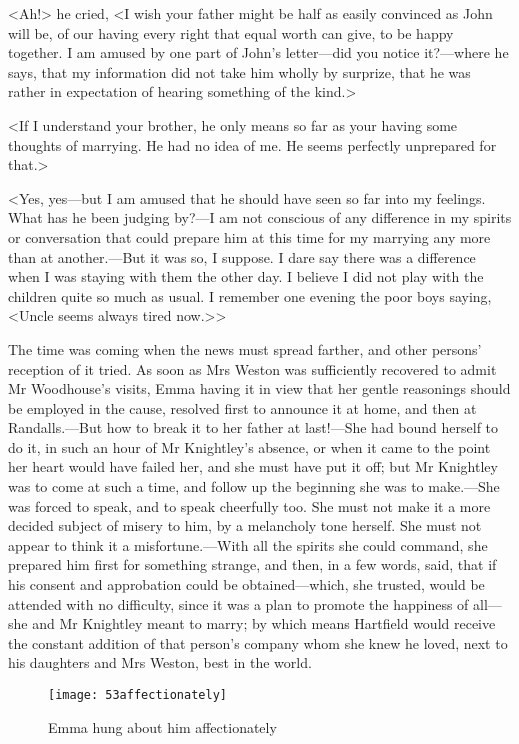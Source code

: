 <Ah!> he cried, <I wish your father might be half as easily convinced as John will be, of our having every right that equal worth can give, to be happy together. I am amused by one part of John's letter—did you notice it?—where he says, that my information did not take him wholly by surprize, that he was rather in expectation of hearing something of the kind.>

<If I understand your brother, he only means so far as your having some thoughts of marrying. He had no idea of me. He seems perfectly unprepared for that.>

<Yes, yes—but I am amused that he should have seen so far into my feelings. What has he been judging by?—I am not conscious of any difference in my spirits or conversation that could prepare him at this time for my marrying any more than at another.—But it was so, I suppose. I dare say there was a difference when I was staying with them the other day. I believe I did not play with the children quite so much as usual. I remember one evening the poor boys saying, <Uncle seems always tired now.>>

The time was coming when the news must spread farther, and other persons' reception of it tried. As soon as Mrs Weston was sufficiently recovered to admit Mr Woodhouse's visits, Emma having it in view that her gentle reasonings should be employed in the cause, resolved first to announce it at home, and then at Randalls.—But how to break it to her father at last!—She had bound herself to do it, in such an hour of Mr Knightley's absence, or when it came to the point her heart would have failed her, and she must have put it off; but Mr Knightley was to come at such a time, and follow up the beginning she was to make.—She was forced to speak, and to speak cheerfully too. She must not make it a more decided subject of misery to him, by a melancholy tone herself. She must not appear to think it a misfortune.—With all the spirits she could command, she prepared him first for something strange, and then, in a few words, said, that if his consent and approbation could be obtained—which, she trusted, would be attended with no difficulty, since it was a plan to promote the happiness of all—she and Mr Knightley meant to marry; by which means Hartfield would receive the constant addition of that person's company whom she knew he loved, next to his daughters and Mrs Weston, best in the world.

\begin{figure}[tbph]
\centering
\texttt{[image: 53affectionately]}
\caption{Emma hung about him affectionately}
\end{figure}

